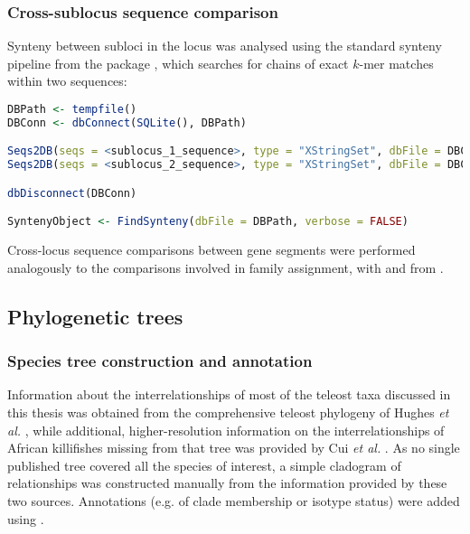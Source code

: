 \subsubsection{Cross-sublocus sequence comparison}
\label{sec:methods_comp_locus_synteny}

Synteny between subloci in the \Nfu locus was analysed using the standard synteny pipeline from the  package  \parencite{wright2016decipher}, which searches for chains of exact $k$-mer matches within two sequences:

\begin{lstlisting}[language=R]
DBPath <- tempfile()
DBConn <- dbConnect(SQLite(), DBPath)

Seqs2DB(seqs = <sublocus_1_sequence>, type = "XStringSet", dbFile = DBConn, identifier = "IGH1", verbose = FALSE)
Seqs2DB(seqs = <sublocus_2_sequence>, type = "XStringSet", dbFile = DBConn, identifier = "IGH2", verbose = FALSE)

dbDisconnect(DBConn)

SyntenyObject <- FindSynteny(dbFile = DBPath, verbose = FALSE)
\end{lstlisting}

\noindent Cross-locus sequence comparisons between gene segments were performed analogously to the comparisons involved in \vh family assignment, with  and  from .


\subsection{Phylogenetic trees}
\label{sec:methods_comp_trees}


\subsubsection{Species tree construction and annotation}
\label{sec:methods_comp_trees_species}

Information about the interrelationships of most of the teleost taxa discussed in this thesis was obtained from the comprehensive teleost phylogeny of Hughes \textit{et al.} \parencite{hughes2018teleostphylo}, while additional, higher-resolution information on the interrelationships of African killifishes missing from that tree was provided by Cui \textit{et al.} \parencite{cui2019annual}. As no single published tree covered all the species of interest, a simple cladogram of relationships was constructed manually from the information provided by these two sources. Annotations (e.g. of clade membership or isotype status) were added using  \parencite{guangchuang2018tidytree}.

